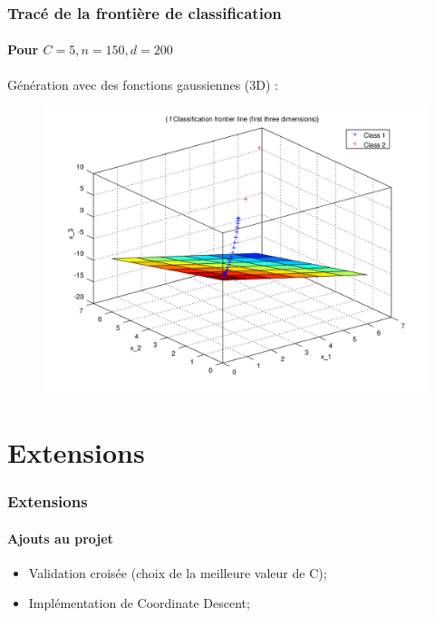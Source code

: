 \documentclass{beamer}
\begin{document}
\begin{frame}
\frametitle{Tracé de la frontière de classification}
\framesubtitle{Pour $C = 5, n = 150, d = 200$}

Génération avec des fonctions gaussiennes (3D) :

         \begin{figure}
         \centering
         \includegraphics[scale=0.4]{images/plane5.png}
         \end{figure}

\end{frame}

\section{Extensions}

\begin{frame}
\frametitle{Extensions}
\framesubtitle{Ajouts au projet}

\begin{itemize}
\item Validation croisée (choix de la meilleure valeur de C);

\item Implémentation de Coordinate Descent;

\end{itemize}

\end{frame}
\end{document}
